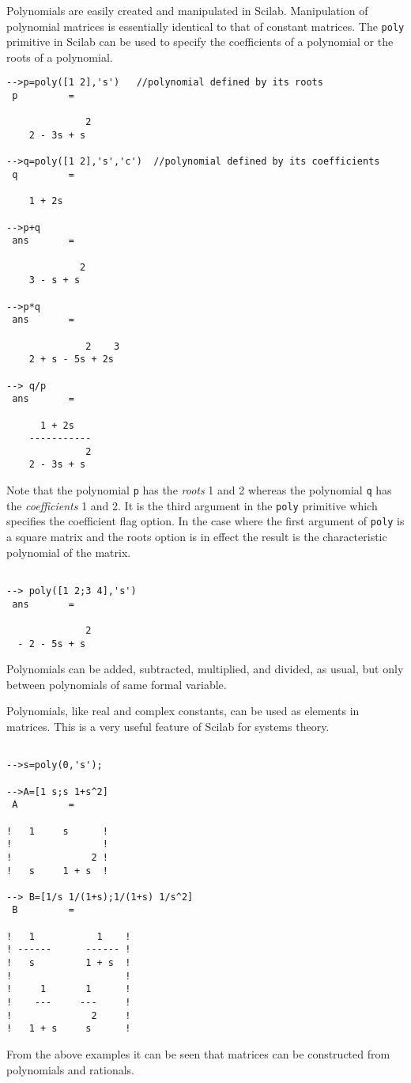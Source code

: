 	Polynomials are easily created and manipulated in Scilab.
Manipulation of polynomial matrices is essentially identical
to that of constant matrices.
The {\tt poly} 
primitive in Scilab can be used to specify the coefficients
of a polynomial or the roots of a polynomial.
\begin{verbatim}
-->p=poly([1 2],'s')   //polynomial defined by its roots
 p         =
 
              2  
    2 - 3s + s   
 
-->q=poly([1 2],'s','c')  //polynomial defined by its coefficients
 q         =
 
    1 + 2s   
 
-->p+q
 ans       =
 
             2  
    3 - s + s   
 
-->p*q
 ans       =
 
              2    3  
    2 + s - 5s + 2s   
 
--> q/p
 ans       =
 
      1 + 2s     
    -----------  
              2  
    2 - 3s + s   
\end{verbatim}
Note that the polynomial {\tt p} has the {\em roots}
1 and 2 whereas the polynomial {\tt q} has the {\em coefficients}
1 and 2.  It is the third argument in the {\tt poly} primitive which
specifies the coefficient flag option.  
In the case where the first argument of {\tt poly} is a square matrix
and the roots option is in effect the result is the characteristic
polynomial of the matrix.
\begin{verbatim}
 
--> poly([1 2;3 4],'s')
 ans       =
 
              2  
  - 2 - 5s + s   
\end{verbatim}
Polynomials can be added,
subtracted, multiplied, and divided, as usual, but only between polynomials
of same formal variable.

	Polynomials, like real and complex constants, can be used
as elements in matrices.  This is a very useful feature of Scilab
for systems theory.
\begin{verbatim}
 
-->s=poly(0,'s');
 
-->A=[1 s;s 1+s^2]
 A         =
 
!   1     s      !
!                !
!              2 !
!   s     1 + s  !
 
--> B=[1/s 1/(1+s);1/(1+s) 1/s^2]
 B         =
 
!   1           1    !
! ------      ------ !
!   s         1 + s  !
!                    !
!     1       1      !
!    ---     ---     !
!              2     !
!   1 + s     s      !

\end{verbatim}
From the above examples it can be seen that matrices can be constructed
from polynomials and rationals.

